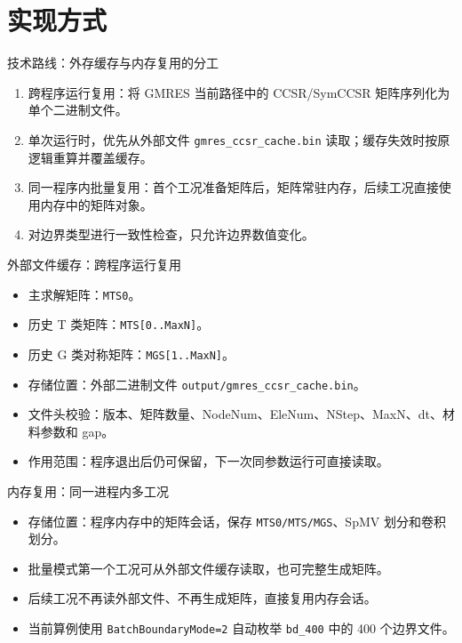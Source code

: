 \documentclass[aspectratio=169,UTF8]{ctexbeamer}
\begin{document}
\section{实现方式}

\begin{frame}{技术路线：外存缓存与内存复用的分工}
  \begin{enumerate}
    \item 跨程序运行复用：将 GMRES 当前路径中的 CCSR/SymCCSR 矩阵序列化为单个二进制文件。
    \item 单次运行时，优先从外部文件 \texttt{gmres\_ccsr\_cache.bin} 读取；缓存失效时按原逻辑重算并覆盖缓存。
    \item 同一程序内批量复用：首个工况准备矩阵后，矩阵常驻内存，后续工况直接使用内存中的矩阵对象。
    \item 对边界类型进行一致性检查，只允许边界数值变化。
  \end{enumerate}
\end{frame}

\begin{frame}{外部文件缓存：跨程序运行复用}
  \begin{itemize}
    \item 主求解矩阵：\texttt{MTS0}。
    \item 历史 T 类矩阵：\texttt{MTS[0..MaxN]}。
    \item 历史 G 类对称矩阵：\texttt{MGS[1..MaxN]}。
    \item 存储位置：外部二进制文件 \texttt{output/gmres\_ccsr\_cache.bin}。
    \item 文件头校验：版本、矩阵数量、NodeNum、EleNum、NStep、MaxN、dt、材料参数和 gap。
    \item 作用范围：程序退出后仍可保留，下一次同参数运行可直接读取。
  \end{itemize}
\end{frame}

\begin{frame}{内存复用：同一进程内多工况}
  \begin{itemize}
    \item 存储位置：程序内存中的矩阵会话，保存 \texttt{MTS0/MTS/MGS}、SpMV 划分和卷积划分。
    \item 批量模式第一个工况可从外部文件缓存读取，也可完整生成矩阵。
    \item 后续工况不再读外部文件、不再生成矩阵，直接复用内存会话。
    \item 当前算例使用 \texttt{BatchBoundaryMode=2} 自动枚举 \texttt{bd\_400} 中的 400 个边界文件。
  \end{itemize}
\end{frame}
\end{document}
